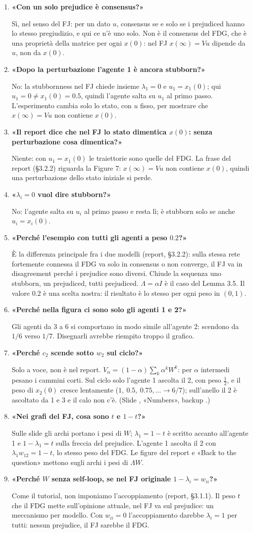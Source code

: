 \documentclass[a4paper,10pt]{article}
\newcommand{\fr}[1]{\getrefnumber{P-#1}}      %
\newcommand{\D}[2]{\item \textbf{«#1»}\par #2}
\newcommand{\priorita}[1]{\par\smallskip{\color{unipd}\itshape #1}\par}
\begin{document}
\priorita{Priorità media}
\begin{enumerate}[resume*=fj]
  \D{Con un solo prejudice è consensus?}{Sì, nel senso del FJ: per un dato $u$, consensus se e solo se i prejudiced hanno lo stesso pregiudizio, e qui ce n'è uno solo. Non è il consensus del FDG, che è una proprietà della matrice per ogni $x(0)$: nel FJ $x(\infty)=Vu$ dipende da $u$, non da $x(0)$.}
  \D{Dopo la perturbazione l'agente 1 è ancora stubborn?}{No: la stubbornness nel FJ chiede insieme $\lambda_1=0$ e $u_1=x_1(0)$; qui $u_1=0\neq x_1(0)=0.5$, quindi l'agente salta su $u_1$ al primo passo. L'esperimento cambia solo lo stato, con $u$ fisso, per mostrare che $x(\infty)=Vu$ non contiene $x(0)$.}
  \D{Il report dice che nel FJ lo stato dimentica $x(0)$: senza perturbazione cosa dimentica?}{Niente: con $u_1=x_1(0)$ le traiettorie sono quelle del FDG. La frase del report (§3.2.2) riguarda la Figure 7: $x(\infty)=Vu$ non contiene $x(0)$, quindi una perturbazione dello stato iniziale si perde.}
  \D{$\lambda_i=0$ vuol dire stubborn?}{No: l'agente salta su $u_i$ al primo passo e resta lì; è stubborn solo se anche $u_i=x_i(0)$.}
  \D{Perché l'esempio con tutti gli agenti a peso $0.2$?}{È la differenza principale fra i due modelli (report, §3.2.2): sulla stessa rete fortemente connessa il FDG va solo in consensus o non converge, il FJ va in disagreement perché i prejudice sono diversi. Chiude la sequenza uno stubborn, un prejudiced, tutti prejudiced. $\Lambda=\alpha I$ è il caso del Lemma 3.5. Il valore $0.2$ è una scelta nostra: il risultato è lo stesso per ogni peso in $(0,1)$.}
  \D{Perché nella figura ci sono solo gli agenti 1 e 2?}{Gli agenti da 3 a 6 si comportano in modo simile all'agente 2: scendono da $1/6$ verso $1/7$. Disegnarli avrebbe riempito troppo il grafico.}
  \D{Perché $c_2$ scende sotto $w_2$ sul ciclo?}{Solo a voce, non è nel report. $V_\alpha=(1-\alpha)\sum_k\alpha^kW^k$: per $\alpha$ intermedi pesano i cammini corti. Sul ciclo solo l'agente 1 ascolta il 2, con peso $\frac12$, e il peso di $x_2(0)$ cresce lentamente ($1,\ 0.5,\ 0.75,\dots\to6/7$); sull'anello il 2 è ascoltato da 1 e 3 e il calo non c'è. (Slide \fr{m-lemma}, «Numbers», backup \fr{bk-lemma-numbers}.)}
  \D{Nei grafi del FJ, cosa sono $t$ e $1-t$?}{Sulle slide gli archi portano i pesi di $W$; $\lambda_1=1-t$ è scritto accanto all'agente 1 e $1-\lambda_1=t$ sulla freccia del prejudice. L'agente 1 ascolta il 2 con $\lambda_1w_{12}=1-t$, lo stesso peso del FDG. Le figure del report e «Back to the question» mettono sugli archi i pesi di $\Lambda W$.}
  \D{Perché $W$ senza self-loop, se nel FJ originale $1-\lambda_i=w_{ii}$?}{Come il tutorial, non imponiamo l'accoppiamento (report, §3.1.1). Il peso $t$ che il FDG mette sull'opinione attuale, nel FJ va sul prejudice: un meccanismo per modello. Con $w_{ii}=0$ l'accoppiamento darebbe $\lambda_i=1$ per tutti: nessun prejudice, il FJ sarebbe il FDG.}

\end{enumerate}
\end{document}
